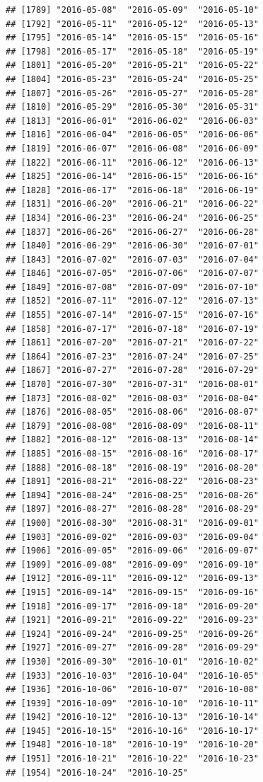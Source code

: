 \documentclass[10pt]{article}\usepackage[]{graphicx}\usepackage[]{color}
\makeatletter
\newenvironment{kframe}{%
 \def\at@end@of@kframe{}%
 \ifinner\ifhmode%
  \def\at@end@of@kframe{\end{minipage}}%
  \begin{minipage}{\columnwidth}%
 \fi\fi%
 \def\FrameCommand##1{\hskip\@totalleftmargin \hskip-\fboxsep
 \colorbox{shadecolor}{##1}\hskip-\fboxsep
     \hskip-\linewidth \hskip-\@totalleftmargin \hskip\columnwidth}%
 \MakeFramed {\advance\hsize-\width
   \@totalleftmargin\z@ \linewidth\hsize
   \@setminipage}}%
 {\par\unskip\endMakeFramed%
 \at@end@of@kframe}
\newenvironment{knitrout}{}{} %
\theoremstyle{plain}
\makeatother
\begin{document}
\begin{knitrout}
\begin{kframe}
\begin{verbatim}
## [1789] "2016-05-08"  "2016-05-09"  "2016-05-10" 
## [1792] "2016-05-11"  "2016-05-12"  "2016-05-13" 
## [1795] "2016-05-14"  "2016-05-15"  "2016-05-16" 
## [1798] "2016-05-17"  "2016-05-18"  "2016-05-19" 
## [1801] "2016-05-20"  "2016-05-21"  "2016-05-22" 
## [1804] "2016-05-23"  "2016-05-24"  "2016-05-25" 
## [1807] "2016-05-26"  "2016-05-27"  "2016-05-28" 
## [1810] "2016-05-29"  "2016-05-30"  "2016-05-31" 
## [1813] "2016-06-01"  "2016-06-02"  "2016-06-03" 
## [1816] "2016-06-04"  "2016-06-05"  "2016-06-06" 
## [1819] "2016-06-07"  "2016-06-08"  "2016-06-09" 
## [1822] "2016-06-11"  "2016-06-12"  "2016-06-13" 
## [1825] "2016-06-14"  "2016-06-15"  "2016-06-16" 
## [1828] "2016-06-17"  "2016-06-18"  "2016-06-19" 
## [1831] "2016-06-20"  "2016-06-21"  "2016-06-22" 
## [1834] "2016-06-23"  "2016-06-24"  "2016-06-25" 
## [1837] "2016-06-26"  "2016-06-27"  "2016-06-28" 
## [1840] "2016-06-29"  "2016-06-30"  "2016-07-01" 
## [1843] "2016-07-02"  "2016-07-03"  "2016-07-04" 
## [1846] "2016-07-05"  "2016-07-06"  "2016-07-07" 
## [1849] "2016-07-08"  "2016-07-09"  "2016-07-10" 
## [1852] "2016-07-11"  "2016-07-12"  "2016-07-13" 
## [1855] "2016-07-14"  "2016-07-15"  "2016-07-16" 
## [1858] "2016-07-17"  "2016-07-18"  "2016-07-19" 
## [1861] "2016-07-20"  "2016-07-21"  "2016-07-22" 
## [1864] "2016-07-23"  "2016-07-24"  "2016-07-25" 
## [1867] "2016-07-27"  "2016-07-28"  "2016-07-29" 
## [1870] "2016-07-30"  "2016-07-31"  "2016-08-01" 
## [1873] "2016-08-02"  "2016-08-03"  "2016-08-04" 
## [1876] "2016-08-05"  "2016-08-06"  "2016-08-07" 
## [1879] "2016-08-08"  "2016-08-09"  "2016-08-11" 
## [1882] "2016-08-12"  "2016-08-13"  "2016-08-14" 
## [1885] "2016-08-15"  "2016-08-16"  "2016-08-17" 
## [1888] "2016-08-18"  "2016-08-19"  "2016-08-20" 
## [1891] "2016-08-21"  "2016-08-22"  "2016-08-23" 
## [1894] "2016-08-24"  "2016-08-25"  "2016-08-26" 
## [1897] "2016-08-27"  "2016-08-28"  "2016-08-29" 
## [1900] "2016-08-30"  "2016-08-31"  "2016-09-01" 
## [1903] "2016-09-02"  "2016-09-03"  "2016-09-04" 
## [1906] "2016-09-05"  "2016-09-06"  "2016-09-07" 
## [1909] "2016-09-08"  "2016-09-09"  "2016-09-10" 
## [1912] "2016-09-11"  "2016-09-12"  "2016-09-13" 
## [1915] "2016-09-14"  "2016-09-15"  "2016-09-16" 
## [1918] "2016-09-17"  "2016-09-18"  "2016-09-20" 
## [1921] "2016-09-21"  "2016-09-22"  "2016-09-23" 
## [1924] "2016-09-24"  "2016-09-25"  "2016-09-26" 
## [1927] "2016-09-27"  "2016-09-28"  "2016-09-29" 
## [1930] "2016-09-30"  "2016-10-01"  "2016-10-02" 
## [1933] "2016-10-03"  "2016-10-04"  "2016-10-05" 
## [1936] "2016-10-06"  "2016-10-07"  "2016-10-08" 
## [1939] "2016-10-09"  "2016-10-10"  "2016-10-11" 
## [1942] "2016-10-12"  "2016-10-13"  "2016-10-14" 
## [1945] "2016-10-15"  "2016-10-16"  "2016-10-17" 
## [1948] "2016-10-18"  "2016-10-19"  "2016-10-20" 
## [1951] "2016-10-21"  "2016-10-22"  "2016-10-23" 
## [1954] "2016-10-24"  "2016-10-25"
\end{verbatim}
\end{kframe}
\end{knitrout}
\end{document}
